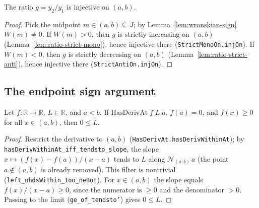 \begin{lemma}
    \label{lem:ratio-injective}
    \leanok
    The ratio $g = y_2 / y_1$ is injective on $(a,b)$.
\end{lemma}
\begin{proof}
    Pick the midpoint $m \in (a,b) \subseteq J$; by
    Lemma~\ref{lem:wronskian-sign} $W(m) \ne 0$. If $W(m) > 0$, then $g$ is
    strictly increasing on $(a,b)$ (Lemma~\ref{lem:ratio-strict-mono}), hence
    injective there (\texttt{StrictMonoOn.injOn}). If $W(m) < 0$, then $g$ is
    strictly decreasing on $(a,b)$ (Lemma~\ref{lem:ratio-strict-anti}), hence
    injective there (\texttt{StrictAntiOn.injOn}).
\end{proof}

\subsection{The endpoint sign argument}

\begin{lemma}
    \label{lem:deriv-right-nonneg}
    \leanok
    Let $f : \mathbb{R} \to \mathbb{R}$, $L \in \mathbb{R}$, and $a < b$.
    If $\mathrm{HasDerivAt}\;f\;L\;a$, $f(a) = 0$, and $f(x) \ge 0$ for all
    $x \in (a,b)$, then $0 \le L$.
\end{lemma}
\begin{proof}
    Restrict the derivative to $(a,b)$
    (\texttt{HasDerivAt.hasDerivWithinAt}); by
    \texttt{hasDerivWithinAt\_iff\_tendsto\_slope}, the slope
    $x \mapsto (f(x) - f(a))/(x - a)$ tends to $L$ along
    $\mathcal{N}_{(a,b)}\,a$ (the point $a \notin (a,b)$ is already removed).
    This filter is nontrivial (\texttt{left\_nhdsWithin\_Ioo\_neBot}). For
    $x \in (a,b)$ the slope equals $f(x)/(x - a) \ge 0$, since the numerator is
    $\ge 0$ and the denominator $> 0$. Passing to the limit
    (\texttt{ge\_of\_tendsto'}) gives $0 \le L$.
\end{proof}

